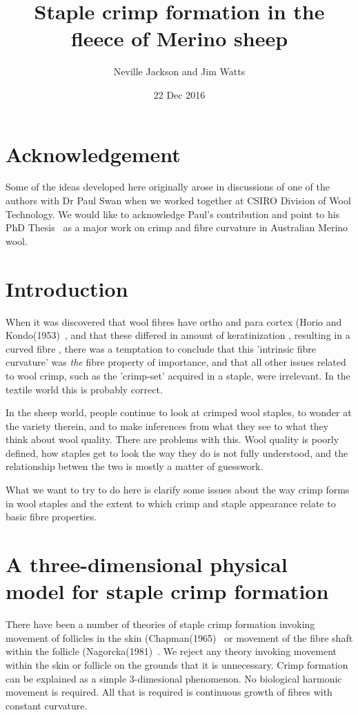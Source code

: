 \documentclass[titlepage,10pt]{article}  %
\title{ Staple crimp formation in the fleece of Merino sheep}
\author{Neville Jackson and Jim Watts }
\date{22 Dec 2016}
\begin{document}
 
 
\maketitle      
\tableofcontents

\clearpage
\section{Acknowledgement}
Some of the ideas developed here originally arose in discussions of one of the authors with Dr Paul Swan when we worked together at CSIRO Division of Wool Technology. We would like to acknowledge Paul's contribution and point to his PhD Thesis~\cite{swan:93} as a major work on crimp and fibre curvature in Australian Merino wool.


\clearpage
\section{Introduction} 
When it was discovered that wool fibres have ortho and para cortex (Horio and Kondo(1953)~\cite{hori:53}, and that these differed in amount of keratinization , resulting in a curved fibre , there was a temptation to conclude that this 'intrinsic fibre curvature' was {\em the} fibre property of importance, and that all other issues related to wool crimp, such as the 'crimp-set' acquired in a staple, were irrelevant. In the textile world this is probably correct.

In the sheep world, people continue to look at crimped wool staples, to wonder at the variety therein, and to make inferences from what they see to what they think about wool quality. There are problems with this. Wool  quality is poorly defined, how staples get to look the way they do is not fully understood, and the relationship betwen the two is mostly a matter of guesswork.

What we want to try to do here is clarify some issues about the way crimp forms in wool staples and the extent to which crimp and staple appearance relate to basic fibre properties.

\clearpage
\section{A three-dimensional physical model for staple crimp formation}
There have been a number of theories of staple crimp  formation invoking movement of follicles in the skin (Chapman(1965)~\cite{chap:65} or movement of the fibre shaft within the follicle (Nagorcka(1981)~\cite{nago:81}.  We reject any theory invoking movement within the skin or follicle on the grounds that it is unnecessary. Crimp formation can be explained as a simple 3-dimesional phenomenon. No biological harmonic movement is required. All that is required is continuous growth of  fibres with constant curvature.
\end{document}

